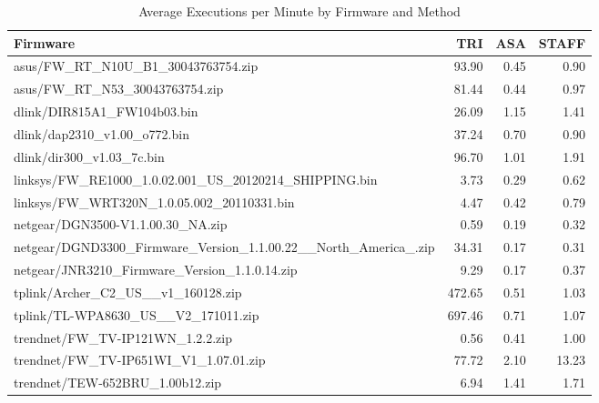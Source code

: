 \begin{table}[htbp]
\centering
\caption{Average Executions per Minute by Firmware and Method}
\label{tab:execs_per_min}
\begin{tabular}{lrrr}
\toprule
Firmware & TRI & ASA & STAFF \\
\midrule
asus/FW_RT_N10U_B1_30043763754.zip & 93.90 & 0.45 & 0.90 \\
asus/FW_RT_N53_30043763754.zip & 81.44 & 0.44 & 0.97 \\
dlink/DIR815A1_FW104b03.bin & 26.09 & 1.15 & 1.41 \\
dlink/dap2310_v1.00_o772.bin & 37.24 & 0.70 & 0.90 \\
dlink/dir300_v1.03_7c.bin & 96.70 & 1.01 & 1.91 \\
linksys/FW_RE1000_1.0.02.001_US_20120214_SHIPPING.bin & 3.73 & 0.29 & 0.62 \\
linksys/FW_WRT320N_1.0.05.002_20110331.bin & 4.47 & 0.42 & 0.79 \\
netgear/DGN3500-V1.1.00.30_NA.zip & 0.59 & 0.19 & 0.32 \\
netgear/DGND3300_Firmware_Version_1.1.00.22__North_America_.zip & 34.31 & 0.17 & 0.31 \\
netgear/JNR3210_Firmware_Version_1.1.0.14.zip & 9.29 & 0.17 & 0.37 \\
tplink/Archer_C2_US__v1_160128.zip & 472.65 & 0.51 & 1.03 \\
tplink/TL-WPA8630_US__V2_171011.zip & 697.46 & 0.71 & 1.07 \\
trendnet/FW_TV-IP121WN_1.2.2.zip & 0.56 & 0.41 & 1.00 \\
trendnet/FW_TV-IP651WI_V1_1.07.01.zip & 77.72 & 2.10 & 13.23 \\
trendnet/TEW-652BRU_1.00b12.zip & 6.94 & 1.41 & 1.71 \\
\bottomrule
\end{tabular}
\end{table}
